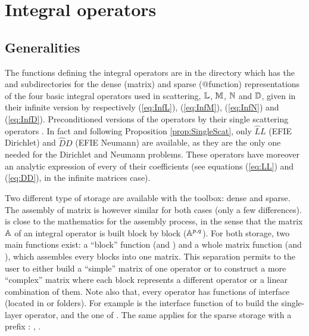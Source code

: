 \section{Integral operators}
\label{sec:ResolutionMuDiff}

\subsection{Generalities}

The functions defining the integral operators are in the directory  which has the 
and  subdirectories for the dense (matrix) and sparse (@function) representations of the four basic integral operators used in scattering,
\ie ${\mathbb{L}}$, ${\mathbb{M}}$, ${\mathbb{N}}$ and ${\mathbb{D}}$, given in their infinite version by respectively (\ref{eq:InfL}), (\ref{eq:InfM}), (\ref{eq:InfN}) and (\ref{eq:InfD}). Preconditioned versions of the operators by their single scattering operators \cite{Thi14}. In fact and following Proposition \ref{prop:SingleScat}, only $\widehat{L}L$ (EFIE Dirichlet) and $\widehat{D}D$ (EFIE Neumann) are available, as they are the only one needed for the Dirichlet and Neumann problems. These operators have moreover an analytic expression of every of their coefficients (see equations (\ref{eq:LL}) and (\ref{eq:DD}), in the infinite matrices case).

Two different type of storage are available with the \mudiff toolbox: dense and sparse. The assembly of matrix is however similar for both cases (only a few differences). \mudiff is close to the mathematics for the assembly process, in the sense that the matrix ${\mathbb{A}}$ of an integral operator is built block by block ($\mathbb{A}^{p,q}$). For both storage, two main functions exist: a ``block'' function (\BlockIntegralOperator and \SpBlockIntegralOperator) and a whole matrix function (\IntegralOperator and \SpIntegralOperator), which assembles every blocks into one matrix. This separation permits to the user to either build a ``simple'' matrix of one operator or to construct a more ``complex'' matrix where each block represents a different operator or a linear combination of them. Note also that, every operator has functions of interface (located in  or  folders). For example \SingleLayer is the interface function of \IntegralOperator to build the single-layer operator, and \BlockSingleLayer the one of \BlockIntegralOperator. The same applies for the sparse storage with a prefix :  \SpSingleLayer,  \SpBlockSingleLayer.


